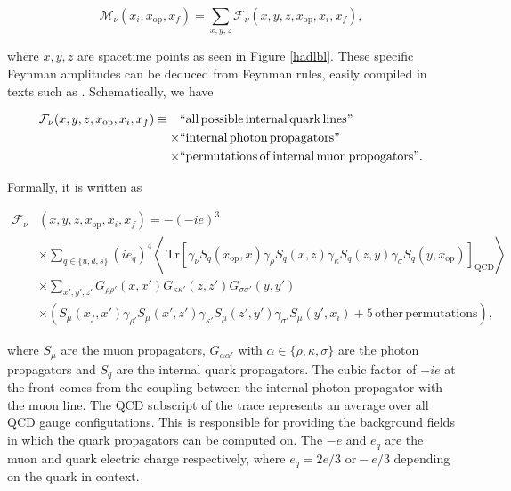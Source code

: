 \documentclass{article}
\numberwithin{equation}{section} %
\begin{document}
\begin{equation}
\mathcal{M}_\nu(x_i,x_\mathrm{op},x_f) = \sum_{x,y,z} \mathcal{F}_\nu(x,y,z,x_\mathrm{op},x_i,x_f),
\label{Feynman amplitude}
\end{equation} 

\noindent where $x,y,z$ are spacetime points as seen in Figure \ref{hadlbl}. These specific Feynman amplitudes can be deduced from Feynman rules, easily compiled in texts such as \cite{tong}. Schematically, we have 

\begin{equation}
\begin{split}
\mathcal{F}_\nu(x,y,z,x_\mathrm{op},x_i,x_f) \equiv \quad &\mathrm{``all \, possible} \,  \mathrm{internal \, quark \, lines"} \\
\times &\mathrm{``internal \, photon \, propagators"}\\
\times &\mathrm{``permutations \, of \, internal \, muon \, propogators"}.
\end{split}
\end{equation}

\noindent Formally, it is written as

\begin{equation}
\begin{split}
\mathcal{F}_\nu &(x,y,z,x_\mathrm{op}, x_i, x_f) = -(-ie)^3 \\
& \times \sum_{q\in \{u,d,s\}}(ie_q)^4 \left\langle \, \mathrm{Tr}[\gamma_\nu S_q(x_\mathrm{op},x) \gamma_\rho S_q(x,z) \gamma_\kappa S_q(z,y) \gamma_\sigma S_q(y,x_\mathrm{op})]_\mathrm{QCD} \right\rangle \\
&\times \sum_{x',y',z'} G_{\rho\rho '}(x,x')G_{\kappa\kappa '} (z,z') G_{\sigma\sigma '}(y,y')\\
&\times \left( S_\mu(x_f,x') \gamma_{\rho '} S_\mu(x',z') \gamma_{\kappa '} S_\mu(z',y') \gamma_{\sigma '} S_\mu(y',x_i) + \mathrm{5 \, other \, permutations} \right),
\end{split}
\label{Feynman amplitude full}
\end{equation}

\noindent where $S_\mu$ are the muon propagators, $G_{\alpha \alpha '}$ with $\alpha \in \{\rho,\kappa,\sigma \}$ are the photon propagators and $S_q$ are the internal quark propagators. The cubic factor of $-ie$ at the front comes from the coupling between the internal photon propagator with the muon line. The QCD subscript of the trace represents an average over all QCD gauge configutations. This is responsible for providing the background fields in which the quark propagators can be computed on. The $-e$ and $e_q$ are the muon and quark electric charge respectively, where $e_q = 2e/3 \, \, \mathrm{or} -e/3$ depending on the quark in context.  
\end{document}
